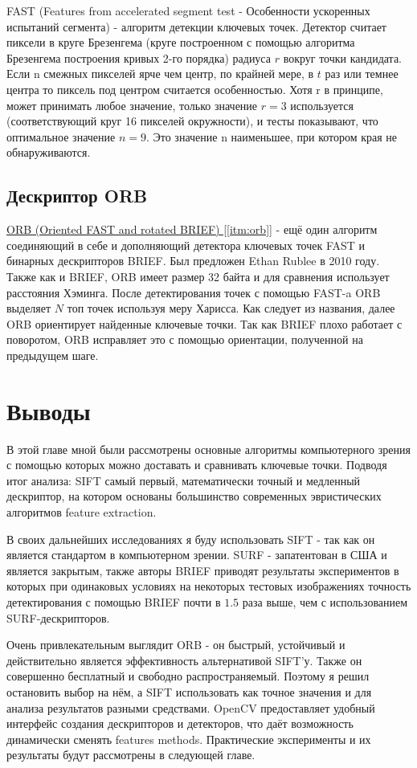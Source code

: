FAST (Features from accelerated segment test - Особенности ускоренных испытаний сегмента) - алгоритм детекции ключевых точек. Детектор считает пиксели в круге Брезенгема (круге построенном с помощью алгоритма Брезенгема построения кривых 2-го порядка) радиуса $r$ вокруг точки кандидата. Если n смежных пикселей ярче чем центр, по крайней мере, в $t$ раз или темнее центра то пиксель под центром считается особенностью. Хотя r в принципе, может принимать любое значение, только значение $r=3$ используется (соответствующий круг 16 пикселей окружности), и тесты показывают, что оптимальное значение $n=9$. Это значение n наименьшее, при котором края не обнаруживаются.

\subsection{Дескриптор ORB}

\hyperref[itm:orb]{ ORB (Oriented FAST and rotated BRIEF) [\ref{itm:orb}]} - ещё один алгоритм соединяющий в себе и дополняющий детектора ключевых точек FAST и бинарных дескрипторов BRIEF. Был предложен Ethan Rublee в 2010 году. Также как и BRIEF, ORB имеет размер 32 байта и для сравнения использует расстояния Хэминга. После детектирования точек с помощью FAST-a ORB выделяет $N$ топ точек используя меру Харисса. Как следует из названия, далее ORB ориентирует найденные ключевые точки. Так как BRIEF плохо работает с поворотом, ORB исправляет это с помощью ориентации, полученной на предыдущем шаге.

\section{Выводы}

В этой главе мной были рассмотрены основные алгоритмы компьютерного зрения с помощью которых можно доставать и сравнивать ключевые точки. Подводя итог анализа: SIFT самый первый, математически точный и медленный дескриптор, на котором основаны большинство современных эвристических алгоритмов feature extraction.

В своих дальнейших исследованиях я буду использовать SIFT - так как он является стандартом в компьютерном зрении. SURF - запатентован в США и является закрытым, также авторы BRIEF приводят результаты экспериментов в которых при одинаковых условиях на некоторых тестовых изображениях точность детектирования с помощью BRIEF почти в $1.5$ раза выше, чем с использованием SURF-дескрипторов.

Очень привлекательным выглядит ORB - он быстрый, устойчивый и действительно является эффективность альтернативой SIFT'у. Также он совершенно бесплатный и свободно распространяемый. Поэтому я решил остановить выбор на нём, а SIFT использовать как точное значения и для анализа результатов разными средствами. OpenCV предоставляет удобный интерфейс создания дескрипторов и детекторов, что даёт возможность динамически сменять features methods. Практические эксперименты и их результаты будут рассмотрены в следующей главе.

\newpage
